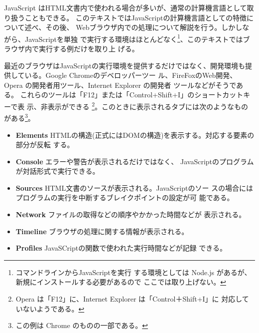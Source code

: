 JavaScript はHTML文書内で使われる場合が多いが、通常の計算機言語として取
り扱うこともできる。
このテキストではJavaScriptの計算機言語としての特徴について述べ、その後、
Webブラウザ内での処理について解説を行う。しかしながら、JavaScriptを単独
で実行する環境はほとんどなく\footnote{コマンドラインからJavaScriptを実行
する環境としては Node.js があるが、新規にインストールする必要があるので
ここでは取り上げない。}、このテキストではブラウザ内で実行する例だけを取り上
げる。

最近のブラウザはJavaScriptの実行環境を提供するだけではなく、開発環境も提
供している。Google Chromeのデベロッパーツー
ル、FireFoxのWeb開発、Opera の開発者用ツール、Internet Explorer の開発者
ツールなどがそうである。
これらのツールは「F12」または「Control+Shift+I」のショートカットキーで表
示、非表示ができる
\footnote{Opera は「F12」に、Internet Explorer は「Control＋Shift+I」に
対応していないようである。}。このときに表示されるタブには次のようなもの
がある\footnote{この例は Chrome のものの一部である。}。
\begin{itemize}
 \item {\bfseries Elements }
       HTMLの構造(正式にはDOMの構造)を表示する。対応する要素の部分が反転
       する。
 \item {\bfseries Console }エラーや警告が表示されるだけではなく、
       JavaScriptのプログラムが対話形式で実行できる。
 \item {\bfseries Sources }HTML文書のソースが表示される。JavaScriptのソー
       スの場合にはプログラムの実行を中断するブレイクポイントの設定が可
       能である。
 \item {\bfseries Network }ファイルの取得などの順序やかかった時間などが
       表示される。
 \item {\bfseries Timeline }ブラウザの処理に関する情報が表示される。
 \item {\bfseries Profiles }JavaSCriptの関数で使われた実行時間などが記録
       できる。
\end{itemize}
